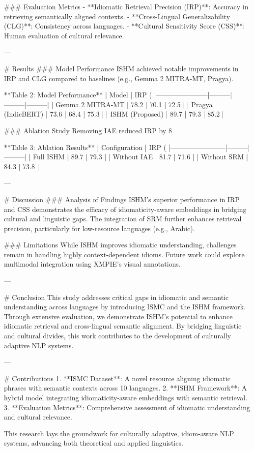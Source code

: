 ### Evaluation Metrics  
- **Idiomatic Retrieval Precision (IRP)**: Accuracy in retrieving semantically aligned contexts.  
- **Cross-Lingual Generalizability (CLG)**: Consistency across languages.  
- **Cultural Sensitivity Score (CSS)**: Human evaluation of cultural relevance.  

---

# Results  
### Model Performance  
ISHM achieved notable improvements in IRP and CLG compared to baselines (e.g., Gemma 2 MITRA-MT, Pragya).  

**Table 2: Model Performance**  
| Model                 | IRP (%
|-----------------------|---------|---------|---------|  
| Gemma 2 MITRA-MT      | 78.2    | 70.1    | 72.5    |  
| Pragya (IndicBERT)    | 73.6    | 68.4    | 75.3    |  
| ISHM (Proposed)       | 89.7    | 79.3    | 85.2    |  

### Ablation Study  
Removing IAE reduced IRP by 8%

**Table 3: Ablation Results**  
| Configuration          | IRP (%
|------------------------|---------|---------|  
| Full ISHM              | 89.7    | 79.3    |  
| Without IAE            | 81.7    | 71.6    |  
| Without SRM            | 84.3    | 73.8    |  

---

# Discussion  
### Analysis of Findings  
ISHM's superior performance in IRP and CSS demonstrates the efficacy of idiomaticity-aware embeddings in bridging cultural and linguistic gaps. The integration of SRM further enhances retrieval precision, particularly for low-resource languages (e.g., Arabic).  

### Limitations  
While ISHM improves idiomatic understanding, challenges remain in handling highly context-dependent idioms. Future work could explore multimodal integration using XMPIE's visual annotations.  

---

# Conclusion  
This study addresses critical gaps in idiomatic and semantic understanding across languages by introducing ISMC and the ISHM framework. Through extensive evaluation, we demonstrate ISHM's potential to enhance idiomatic retrieval and cross-lingual semantic alignment. By bridging linguistic and cultural divides, this work contributes to the development of culturally adaptive NLP systems.

---

# Contributions  
1. **ISMC Dataset**: A novel resource aligning idiomatic phrases with semantic contexts across 10 languages.  
2. **ISHM Framework**: A hybrid model integrating idiomaticity-aware embeddings with semantic retrieval.  
3. **Evaluation Metrics**: Comprehensive assessment of idiomatic understanding and cultural relevance.  

This research lays the groundwork for culturally adaptive, idiom-aware NLP systems, advancing both theoretical and applied linguistics.